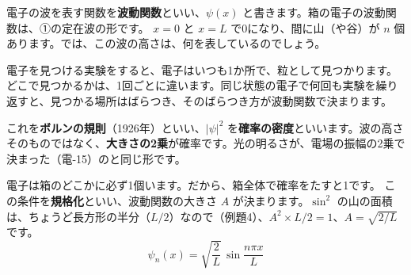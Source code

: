 \label{ph:原-5:sec4}
電子の波を表す関数を\textbf{波動関数}といい、$\psi(x)$ と書きます。箱の電子の波動関数は、①の定在波の形です。
$x=0$ と $x=L$ で0になり、間に山（や谷）が $n$ 個あります。では、この波の高さは、何を表しているのでしょう。

電子を見つける実験をすると、電子はいつも1か所で、粒として見つかります。どこで見つかるかは、1回ごとに違います。同じ状態の電子で何回も実験を繰り返すと、見つかる場所はばらつき、そのばらつき方が波動関数で決まります。
\begin{bkcenter}
\end{bkcenter}
これを\textbf{ボルンの規則}（1926年）といい、$|\psi|^2$ を\textbf{確率の密度}といいます。波の高さそのものではなく、\textbf{大きさの2乗}が確率です。光の明るさが、電場の振幅の2乗で決まった（電-15）のと同じ形です。

電子は箱のどこかに必ず1個います。だから、箱全体で確率をたすと1です。
\label{ph:原-5:kikaku}この条件を\textbf{規格化}といい、波動関数の大きさ $A$ が決まります。$\sin^2$ の山の面積は、ちょうど長方形の半分（$L/2$）なので（例題4）、$A^2\times L/2=1$、$A=\sqrt{2/L}$ です。
\[\psi_n(x)=\sqrt{\frac{2}{L}}\,\sin\frac{n\pi x}{L}\]

